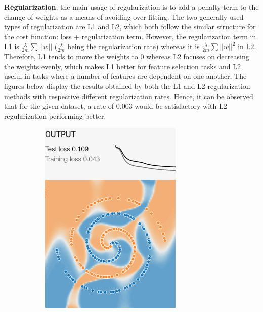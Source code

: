\documentclass[12pt,a4paper]{article}
\begin{document}
\begin{enumerate}
		\noindent \textbf{\small Regularization}: the main usage of regularization is to add a penalty term to the change of weights as a means of avoiding over-fitting. The two generally used types of regularization are L1 and L2, which both follow the similar structure for the cost function: loss + regularization term. However, the regularization term in L1 is $\frac{\lambda}{2m}\sum||w||$ ($\frac{\lambda}{2m}$ being the regularization rate) whereas it is $\frac{\lambda}{2m}\sum||w||^2$ in L2. Therefore, L1 tends to move the weights to 0 whereas L2 focuses on decreasing the weights evenly, which makes L1 better for feature selection tasks and L2 useful in tasks where a number of features are dependent on one another. The figures below display the results obtained by both the L1 and L2 regularization methods with respective different regularization rates. Hence, it can be observed that for the given dataset, a rate of 0.003 would be satisfactory with L2 regularization performing better.
		\begin{figure}[H]
			\centering
			\begin{subfigure}[H]{0.2\textwidth}
				\centering
				\includegraphics[width=\textwidth]{Figures/reg/L0001}

\end{subfigure}
\end{figure}
\end{enumerate}
\end{document}
